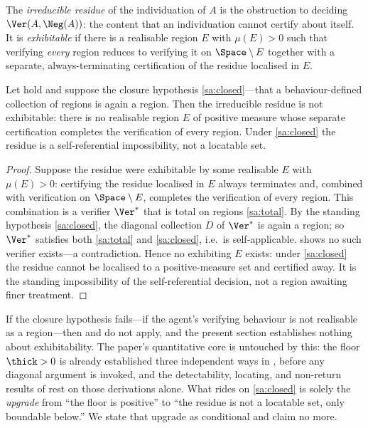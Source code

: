 \begin{definition}
\label{def:irreducible}
The \emph{irreducible residue} of the individuation of $A$ is the obstruction to
deciding $\Ver(A,\Neg(A))$: the content that an individuation cannot certify
about itself. It is \emph{exhibitable} if there is a realisable region $E$ with
$\mu(E)>0$ such that verifying \emph{every} region reduces to verifying it on
$\Space\setminus E$ together with a separate, always-terminating certification of
the residue localised in $E$.
\end{definition}

\begin{theorem}
\label{thm:residue-not-measure}
Let  hold and suppose the closure hypothesis \ref{sa:closed}---that
a behaviour-defined collection of regions is again a region. Then the irreducible
residue is not exhibitable: there is no realisable region $E$ of positive measure
whose separate certification completes the verification of every region. Under
\ref{sa:closed} the residue is a self-referential impossibility, not a locatable
set.
\end{theorem}

\begin{proof}
Suppose the residue were exhibitable by some realisable $E$ with $\mu(E)>0$:
certifying the residue localised in $E$ always terminates and, combined with
verification on $\Space\setminus E$, completes the verification of every region.
This combination is a verifier $\Ver^\ast$ that is total on regions
\ref{sa:total}. By the standing hypothesis \ref{sa:closed}, the diagonal
collection $D$ of $\Ver^\ast$ is again a region; so $\Ver^\ast$ satisfies both
\ref{sa:total} and \ref{sa:closed}, i.e.\ is self-applicable. 
shows no such verifier exists---a contradiction. Hence no exhibiting $E$ exists:
under \ref{sa:closed} the residue cannot be localised to a positive-measure set
and certified away. It is the standing impossibility of the self-referential
decision, not a region awaiting finer treatment.
\end{proof}

\begin{remark}
\label{rem:if-sa-fails}
If the closure hypothesis fails---if the agent's verifying behaviour is not
realisable as a region---then  and 
do not apply, and the present section establishes nothing about exhibitability. The
paper's quantitative core is untouched by this: the floor $\thick>0$ is already
established three independent ways in , before any
diagonal argument is invoked, and the detectability, locating, and non-return
results of  rest on those derivations
alone. What rides on \ref{sa:closed} is solely the \emph{upgrade} from ``the floor
is positive'' to ``the residue is not a locatable set, only boundable below.'' We
state that upgrade as conditional and claim no more.
\end{remark}

